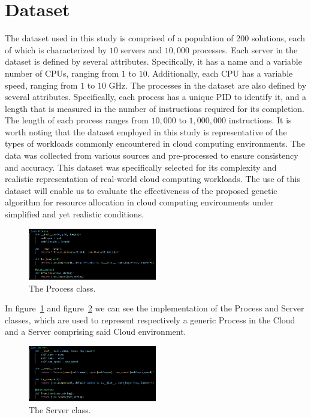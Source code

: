 \section{Dataset}\label{sect:dtst}

The dataset used in this study is comprised of a population of 200 solutions, each of which is characterized by $10$ servers and $10,000$ processes. 
Each server in the dataset is defined by several attributes. 
Specifically, it has a name and a variable number of CPUs, ranging from $1$ to $10$. 
Additionally, each CPU has a variable speed, ranging from $1$ to $10$ GHz. 
The processes in the dataset are also defined by several attributes. 
Specifically, each process has a unique PID to identify it, and a length that is measured in the number of instructions required for its completion. 
The length of each process ranges from $10,000$ to $1,000,000$ instructions. 
It is worth noting that the dataset employed in this study is representative of the types of workloads commonly encountered in cloud computing environments. 
The data was collected from various sources and pre-processed to ensure consistency and accuracy. 
This dataset was specifically selected for its complexity and realistic representation of real-world cloud computing workloads. 
The use of this dataset will enable us to evaluate the effectiveness of the proposed genetic algorithm for resource allocation in cloud computing 
environments under simplified and yet realistic conditions.

\begin{figure}[h]
    \centering
    \includegraphics[width=0.5\textwidth]{./Resources/Code_Snippets/Process_Class.png}
    \caption{The Process class.}
    \label{fig:process}
\end{figure}

In figure~\ref{fig:process} and figure~\ref{fig:server} we can see the implementation of the Process and Server classes, which are used to represent respectively a generic Process in the
Cloud and a Server comprising said Cloud environment.

\begin{figure}[h]
    \centering
    \includegraphics[width=0.5\textwidth]{./Resources/Code_Snippets/Server_Class.png}
    \caption{The Server class.}
    \label{fig:server}
\end{figure}

